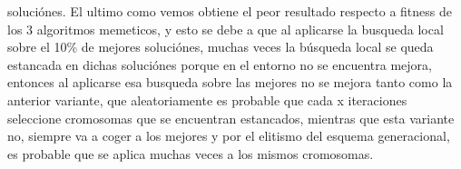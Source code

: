 \documentclass{article}
\begin{document}
soluciónes.
\vspace{3mm}
\newline El ultimo como vemos obtiene el peor resultado respecto a fitness de los 3 algoritmos memeticos, y esto se debe a que al 
aplicarse la busqueda local sobre el 10\% de mejores soluciónes, muchas veces la búsqueda local 
se queda estancada en dichas soluciónes porque en el entorno no se encuentra mejora, entonces al aplicarse esa 
busqueda sobre las mejores no se mejora tanto como la anterior variante, que aleatoriamente es probable 
que cada x iteraciones seleccione cromosomas que se encuentran estancados, mientras que esta 
variante no, siempre va a coger a los mejores y por el elitismo del esquema generacional, es probable que 
se aplica muchas veces a los mismos cromosomas.
\end{document}
